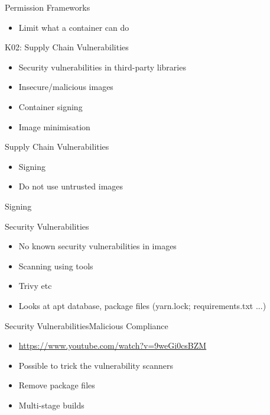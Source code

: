 \documentclass{dcpresentation}
\begin{document}
\begin{frame}{Permission Frameworks}
 \begin{itemize}
  \item Limit what a container can do
 \end{itemize}
\end{frame}

\begin{frame}{K02: Supply Chain Vulnerabilities}
 \begin{itemize}
  \item Security vulnerabilities in third-party libraries
  \item Insecure/malicious images
  \item Container signing
  \item Image minimisation
 \end{itemize}
\end{frame}

\begin{frame}{Supply Chain Vulnerabilities}
 \begin{itemize}
  \item Signing
  \item Do not use untrusted images
 \end{itemize}
Signing

\end{frame}

\begin{frame}{Security Vulnerabilities}
 \begin{itemize}
  \item No known security vulnerabilities in images
  \item Scanning using tools
  \item Trivy etc
  \item Looks at apt database, package files (yarn.lock; requirements.txt ...)
 \end{itemize}  
\end{frame}

\begin{frame}{Security Vulnerabilities}{Malicious Compliance}
 \begin{itemize}
  \item \url{https://www.youtube.com/watch?v=9weGi0csBZM}
  \item Possible to trick the vulnerability scanners
  \item Remove package files
  \item Multi-stage builds
 \end{itemize}  
\end{frame}
\end{document}

